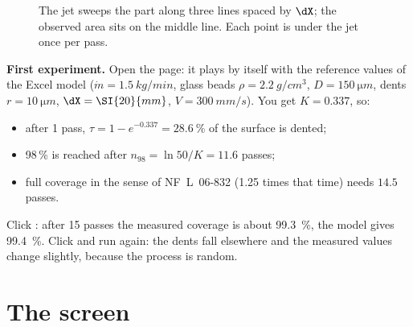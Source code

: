 \documentclass[11pt,a4paper]{article}
\begin{document}
\begin{figure}[H]
\centering
{}
\caption{The jet sweeps the part along three lines spaced by $\dX$; the observed area sits on the middle line. Each point is under the jet once per pass.}
\label{fig:sweep}
\end{figure}

\begin{trybox}
\textbf{First experiment.} Open the page: it plays by itself with the reference values of the Excel model ($\dot m=\SI{1.5}{kg/min}$, glass beads $\rho=\SI{2.2}{g/cm^3}$, $D=\SI{150}{\micro m}$, dents $r=\SI{10}{\micro m}$, $\dX=\SI{20}{mm}$, $V=\SI{300}{mm/s}$). You get $K=0.337$, so:
\begin{itemize}[nosep]
\item after 1 pass, $\tau=1-e^{-0.337}=\SI{28.6}{\percent}$ of the surface is dented;
\item 98\,\% is reached after $n_{98}=\ln 50/K=11.6$ passes;
\item full coverage in the sense of NF~L~06-832 (1.25 times that time) needs $14.5$ passes.
\end{itemize}
Click : after 15 passes the measured coverage is about \SI{99.3}{\percent}, the model gives \SI{99.4}{\percent}. Click  and run again: the dents fall elsewhere and the measured values change slightly, because the process is random.
\end{trybox}

\section{The screen}
\end{document}
